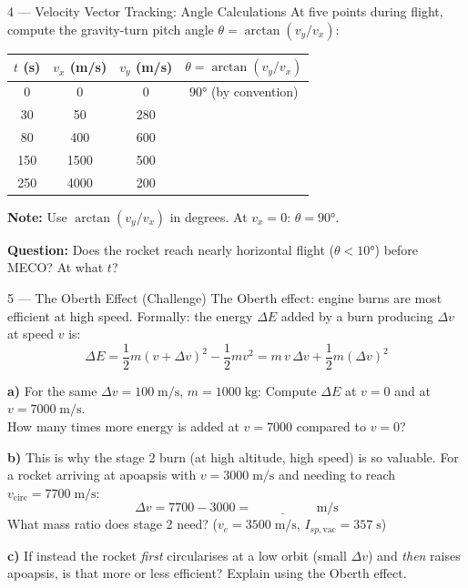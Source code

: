 \documentclass[12pt, a4paper]{article}
\begin{document}
\begin{solutionspace}[10cm]
\end{solutionspace}

\begin{exercisebox}{4 — Velocity Vector Tracking: Angle Calculations}
At five points during flight, compute the gravity-turn pitch angle $\theta = \arctan(v_y/v_x)$:

\begin{center}
\renewcommand{\arraystretch}{1.4}
\begin{tabular}{|c|c|c|c|}
\hline
$t$ (s) & $v_x$ (m/s) & $v_y$ (m/s) & $\theta = \arctan(v_y/v_x)$ \\
\hline
0   & 0    & 0   & $90°$ (by convention) \\
\hline
30  & 50   & 280 & \\
\hline
80  & 400  & 600 & \\
\hline
150 & 1500 & 500 & \\
\hline
250 & 4000 & 200 & \\
\hline
\end{tabular}
\end{center}

\textbf{Note:} Use $\arctan(v_y/v_x)$ in degrees. At $v_x = 0$: $\theta = 90°$.

\textbf{Question:} Does the rocket reach nearly horizontal flight ($\theta < 10°$) before MECO? At what $t$?
\end{exercisebox}

\begin{solutionspace}[6cm]
\end{solutionspace}

\begin{exercisebox}{5 — The Oberth Effect (Challenge)}
The Oberth effect: engine burns are most efficient at high speed. Formally:
the energy $\Delta E$ added by a burn producing $\Delta v$ at speed $v$ is:
\[
  \Delta E = \frac{1}{2}m(v + \Delta v)^2 - \frac{1}{2}mv^2 = m\,v\,\Delta v + \frac{1}{2}m(\Delta v)^2
\]

\textbf{a)} For the same $\Delta v = 100\;\text{m/s}$, $m=1000\;\text{kg}$:
Compute $\Delta E$ at $v = 0$ and at $v = 7000\;\text{m/s}$.\\
How many times more energy is added at $v=7000$ compared to $v=0$?

\textbf{b)} This is why the stage 2 burn (at high altitude, high speed) is so valuable.
For a rocket arriving at apoapsis with $v = 3000\;\text{m/s}$ and needing to reach $v_\text{circ} = 7700\;\text{m/s}$:
\[
  \Delta v = 7700 - 3000 = \underline{\hspace{2cm}}\;\text{m/s}
\]
What mass ratio does stage 2 need? ($v_e = 3500\;\text{m/s}$, $I_{sp,\text{vac}} = 357\;\text{s}$)

\textbf{c)} If instead the rocket \textit{first} circularises at a low orbit (small $\Delta v$) and \textit{then} raises apoapsis,
is that more or less efficient? Explain using the Oberth effect.
\end{exercisebox}
\end{document}
